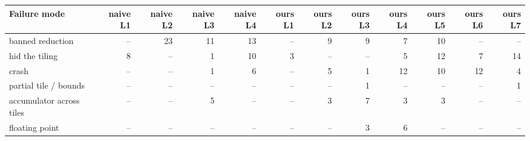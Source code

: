\begin{tabular}{@{}lrrrrrrrrrrr@{}}
\toprule
Failure mode & naive L1 & naive L2 & naive L3 & naive L4 & ours L1 & ours L2 & ours L3 & ours L4 & ours L5 & ours L6 & ours L7 \\
\midrule
banned reduction & -- & 23 & 11 & 13 & -- & 9 & 9 & 7 & 10 & -- & -- \\
hid the tiling & 8 & -- & 1 & 10 & 3 & -- & -- & 5 & 12 & 7 & 14 \\
crash & -- & -- & 1 & 6 & -- & 5 & 1 & 12 & 10 & 12 & 4 \\
partial tile / bounds & -- & -- & -- & -- & -- & -- & 1 & -- & -- & -- & 1 \\
accumulator across tiles & -- & -- & 5 & -- & -- & 3 & 7 & 3 & 3 & -- & -- \\
floating point & -- & -- & -- & -- & -- & -- & 3 & 6 & -- & -- & -- \\
\bottomrule
\end{tabular}
